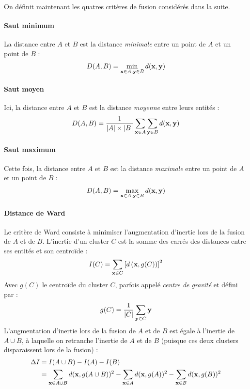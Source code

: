 On définit maintenant les quatres critères de fusion considérés dans la suite. 

\paragraph{Saut minimum}

La distance entre $A$ et $B$ est la distance \textit{minimale} entre un point de $A$ et un point de $B$ :
\begin{equation}
    D(A, B) = \min_{\bf{x} \in A, \bf{y} \in B} d(\bf{x}, \bf{y})
\end{equation}

\paragraph{Saut moyen}

Ici, la distance entre $A$ et $B$ est la distance \textit{moyenne} entre leurs entités :
\begin{equation}
    D(A, B) = \frac{1}{|A| \times |B|} \sum_{\bf{x} \in A} \sum_{\bf{y} \in B} d(\bf{x}, \bf{y})
\end{equation}

\paragraph{Saut maximum}

Cette fois, la distance entre $A$ et $B$ est la distance \textit{maximale} entre un point de $A$ et un point de $B$ :
\begin{equation}
    D(A, B) = \max_{\bf{x} \in A, \bf{y} \in B} d(\bf{x}, \bf{y})
\end{equation}

\paragraph{Distance de Ward}

Le critère de Ward consiste à minimiser l'augmentation d'inertie lors de la fusion de $A$ et de $B$. L'inertie d'un cluster $C$ est la somme des carrés des distances entre ses entités et son centroïde :
\begin{equation}
    I(C) = \sum_{\bf{x} \in C} \left[d\left(\bf{x}, g(C)\right)\right]^2
\end{equation}
Avec $g(C)$ le centroïde du cluster $C$, parfois appelé \textit{centre de gravité} et défini par :
\begin{equation}
    g(C) = \frac{1}{|C|} \sum_{\bf{y} \in C} \bf{y}
\end{equation}
L'augmentation d'inertie lors de la fusion de $A$ et de $B$ est égale à l'inertie de $A \cup B$, à laquelle on retranche l'inertie de $A$ et de $B$ (puisque ces deux clusters disparaissent lors de la fusion) :
\begin{align}
    \Delta I &= I(A \cup B) - I(A) - I(B) \nonumber \\
    &= \sum_{\bf{x} \in A\cup B} d(\bf{x}, g(A \cup B) )^2
    - \sum_{\bf{x} \in A} d(\bf{x}, g(A) )^2
    - \sum_{\bf{x} \in B} d(\bf{x}, g(B) )^2
    \label{eq:te-ward-1}
\end{align}


